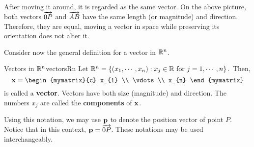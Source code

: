 \begin{center}
\end{center}

After moving it around, it is regarded as the same vector. On the above picture, both vectors $\overrightarrow{0P}$ and $\overrightarrow{AB}$ have the same length (or magnitude) and direction. Therefore, they are equal, moving a vector in space while preserving its orientation does not alter it.

Consider now the general definition for a vector in $\mathbb{R}^n$. 

\begin{definition}{Vectors in $\mathbb{R}^n$}{vectorsRn}
Let $\mathbb{R}^{n} = \left\{ \left( x_{1}, \cdots, x_{n}\right)
:x_{j}\in \mathbb{R}\mbox{ for }j=1,\cdots ,n\right\} .$
Then,
\begin{equation*}
\vect{x}
=
\begin{mymatrix}{c}
x_{1} \\
\vdots \\
x_{n}
\end{mymatrix} 
\end{equation*}
is called a \textbf{vector}. Vectors have both size (magnitude) and direction. 
The numbers $x_{j}$ are called the \textbf{components} of ${\bf x}$. 

\end{definition}

Using this notation, we may use ${\bf p}$ to denote the position vector of point $P$. Notice that in this context, ${\bf p} = \overrightarrow{0P}$. These notations may be used interchangeably. 

